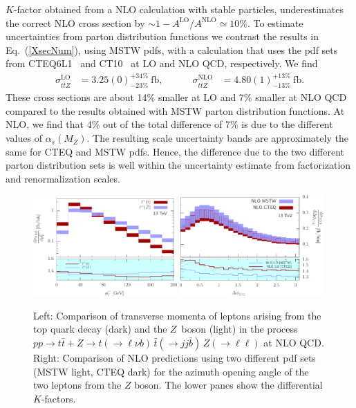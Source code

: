 \documentclass{JHEP3}
\def\ttb{t\bar{t}}
\newcommand{\be}{\begin{eqnarray}}
\newcommand{\ee}{\end{eqnarray}}
\begin{document}
$K$-factor obtained from a NLO calculation with stable particles,
underestimates the correct NLO cross section by $\sim 1-
A^\mathrm{LO}/A^\mathrm{NLO} \simeq 
10\%$.  To estimate uncertainties
from parton distribution functions we contrast the results in
Eq.~(\ref{XsecNum}), using MSTW pdfs, with a calculation that uses the
pdf sets from CTEQ6L1~\cite{Pumplin:2002vw} and CT10~\cite{Lai:2010vv}
at LO and NLO QCD, respectively.  We find \be
\label{XsecNumCTEQ}
  \sigma_{\ttb Z}^\mathrm{LO} &= 3.25(0)^{+34\%}_{-23\%}~\mathrm{fb},
  \quad\quad\quad
  \sigma_{\ttb Z}^\mathrm{NLO} &= 4.80(1)^{+13\%}_{-13\%}~\mathrm{fb}.
\ee
These cross sections are about 14\% smaller at LO and 7\% smaller at NLO QCD compared to the results obtained with MSTW parton distribution functions. 
At NLO, we find that 4\% out of the total difference of 7\% is due to the different values of $\alpha_s(M_Z)$.
The resulting scale uncertainty bands are approximately the same for CTEQ and MSTW pdfs.
Hence, the difference due to the two different parton distribution sets is well within the uncertainty estimate from factorization and renormalization scales.

\begin{figure}[t]
\centering
\includegraphics[width=0.49\textwidth]{./LHC_53_Fig01and03.pdf}
\hfill
\includegraphics[width=0.49\textwidth]{./LHC_53_Fig17e.pdf}
\caption{\label{fig:iii} Left: Comparison of transverse momenta of leptons arising from the top quark decay (dark) and the $Z$~boson  (light)
in the process $pp \to \ttb + Z \to t(\to \ell \nu b) \, \bar{t} (\to jj \bar{b}) \, Z(\to \ell \ell)$ at NLO QCD.
Right: Comparison of NLO predictions using two different pdf sets (MSTW light, CTEQ dark) for the azimuth opening angle of the two leptons from the $Z$ boson.
The lower panes show the differential $K$-factors.}
\end{figure}
\end{document}
